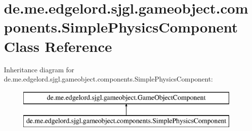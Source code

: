 \hypertarget{classde_1_1me_1_1edgelord_1_1sjgl_1_1gameobject_1_1components_1_1_simple_physics_component}{}\section{de.\+me.\+edgelord.\+sjgl.\+gameobject.\+components.\+Simple\+Physics\+Component Class Reference}
\label{classde_1_1me_1_1edgelord_1_1sjgl_1_1gameobject_1_1components_1_1_simple_physics_component}
Inheritance diagram for de.\+me.\+edgelord.\+sjgl.\+gameobject.\+components.\+Simple\+Physics\+Component\+:\begin{figure}[H]
\begin{center}
\leavevmode
\includegraphics[height=2.000000cm]{classde_1_1me_1_1edgelord_1_1sjgl_1_1gameobject_1_1components_1_1_simple_physics_component}
\end{center}
\end{figure}
